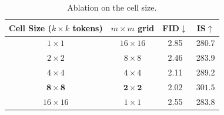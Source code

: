 \documentclass{article}
\theoremstyle{plain}
\theoremstyle{definition}
\theoremstyle{remark}
\begin{document}
\begin{table}[h]
\centering
\scriptsize
\caption{Ablation on the cell size.}
\label{tab:cell_size}
\begin{tabular}{cccc}
\toprule
\textbf{Cell Size ($k \times k$ tokens)} & \textbf{$m \times m$ grid} & \textbf{FID$\downarrow$} & \textbf{IS$\uparrow$} \\
\midrule
$1 \times 1$ & $16 \times 16$ & 2.85 & 280.7 \\
$2 \times 2$ & $8 \times 8$ & 2.46 & 283.9 \\
$4 \times 4$ & $4 \times 4$ & 2.11 & 289.2 \\
\rowcolor[gray]{0.9} %
$\mathbf{8 \times 8}$ & $\mathbf{2 \times 2}$ & $\mathbf{2.02}$ & $\mathbf{301.5}$ \\
$16 \times 16$ & $1 \times 1$ & 2.55 & 283.8 \\
\bottomrule
\end{tabular}
\vspace{-3.75mm}
\end{table}
\end{document}
